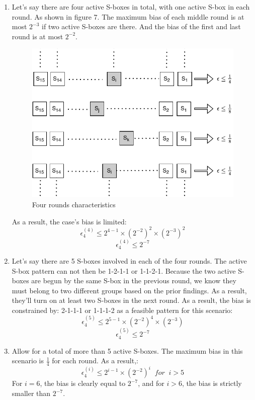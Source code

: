 \documentclass[journal=tosc,preprint]{iacrtrans}
\begin{document}
\begin{enumerate}
	\item  Let's say there are four active S-boxes in total, with one active S-box in each round. As shown in figure 7. The maximum bias of each middle round is at most $2^{-3}$ if two active S-boxes are there. And the bias of the first and last round is at most $2^{-2}$. 
	
    \begin{figure}[h!]
	\centering
	\includegraphics[width=0.7\linewidth, height=0.4\textheight]{LC}
	\caption{Four rounds characteristics}
	\label{fig:lc}
    \end{figure}
As a result, the case's bias is limited: 	\begin{equation*}
	\epsilon_4^{(4)} \leq 2^{4-1} \times (2^{-2})^2 \times (2^{-3})^2
	\end{equation*}
	\begin{equation*}
	\epsilon_4^{(4)} \leq 2^{-7} 
	\end{equation*}
	\item Let's say there are 5 S-boxes involved in each of the four rounds. The active S-box pattern can not then be 1-2-1-1 or 1-1-2-1. Because the two active S-boxes are begun by the same S-box in the previous round, we know they must belong to two different groups based on the prior findings. As a result, they'll turn on at least two S-boxes in the next round. As a result, the bias is constrained by: 2-1-1-1 or 1-1-1-2 as a feasible pattern for this scenario:
	\begin{equation*}
	\epsilon_4^{(5)} \leq 2^{5-1} \times (2^{-2})^4 \times (2^{-3})
	\end{equation*}
	\begin{equation*}
	\epsilon_4^{(5)} \leq 2^{-7} 
	\end{equation*}
	\item Allow for a total of more than 5 active S-boxes. The maximum bias in this scenario is $\frac{1}{4}$ for each round. As a result,: 
	\begin{equation*}
	\epsilon_4^{(i)} \leq 2^{i-1} \times (2^{-2})^i \;\; for \;\; i > 5
	\end{equation*}
	For $i = 6$, the bias is clearly equal to $2^{-7}$, and for $i>6$, the bias is strictly smaller than $2^{-7}$. 
\end{enumerate}
\end{document}
